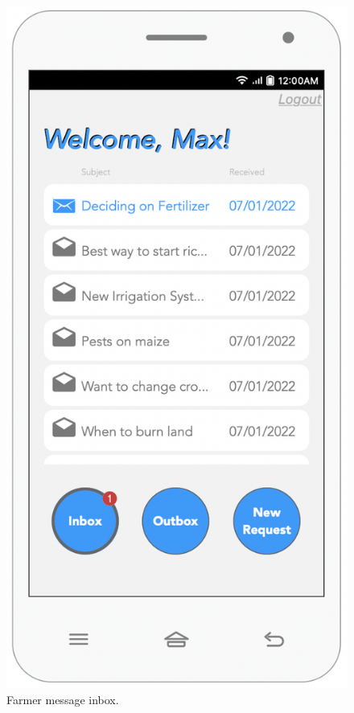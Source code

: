 \begin{multicols}{2}
\begin{figure}[H]
\centering
\includegraphics[scale=0.5]{../images_diagrams/mock_ups/dd/Req01_Inbox.png}
\caption{\label{fig:mock_inbox}Farmer message inbox.}
\end{figure}


\end{multicols}
